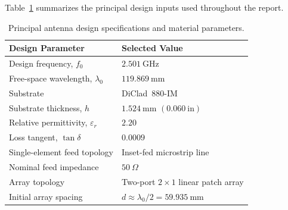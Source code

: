 Table~\ref{tab:design-specifications} summarizes the principal design inputs used throughout the
report.

\begin{table}[htbp]
    \centering
    \caption{Principal antenna design specifications and material parameters.}
    \label{tab:design-specifications}
    \small
    \renewcommand{\arraystretch}{1.15}
    \begin{tabularx}{0.90\textwidth}{@{}>{\raggedright\arraybackslash}X
        >{\raggedright\arraybackslash}p{}@{}}
        \toprule
        \textbf{Design Parameter} & \textbf{Selected Value} \\
        \midrule
        Design frequency, \(f_0\) & \(2.501~\text{GHz}\) \\
        Free-space wavelength, \(\lambda_0\) & \(119.869~\text{mm}\) \\
        Substrate & DiClad~880-IM \\
        Substrate thickness, \(h\) & \(1.524~\text{mm}\) \((0.060~\text{in})\) \\
        Relative permittivity, \(\varepsilon_r\) & \(2.20\) \\
        Loss tangent, \(\tan\delta\) & \(0.0009\) \\
        Single-element feed topology & Inset-fed microstrip line \\
        Nominal feed impedance & \(50~\Omega\) \\
        Array topology & Two-port \(2\times1\) linear patch array \\
        Initial array spacing & \(d \approx \lambda_0/2 = 59.935~\text{mm}\) \\
        \bottomrule
    \end{tabularx}
\end{table}
